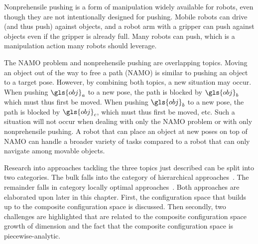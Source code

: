 Nonprehensile pushing is a form of manipulation widely available for robots, even though they are not intentionally designed for pushing. Mobile robots can drive (and thus push) against objects, and a robot arm with a gripper can push against objects even if the gripper is already full. Many robots can push, which is a manipulation action many robots should leverage.\bs

The \ac{NAMO} problem and nonprehensile pushing are overlapping topics. Moving an object out of the way to free a path (\ac{NAMO}) is similar to pushing an object to a target pose. However, by combining both topics, a new situation may occur. When pushing $\gls{obj}_a$ to a new pose, the path is blocked by $\gls{obj}_b$ which must thus first be moved. When pushing $\gls{obj}_b$ to a new pose, the path is blocked by $\gls{obj}_c$, which must thus first be moved, etc. Such a situation will not occur when dealing with only the \ac{NAMO} problem or with only nonprehensile pushing. A robot that can place an object at new poses on top of \ac{NAMO} can handle a broader variety of tasks compared to a robot that can only navigate among movable objects.\bs

Research into approaches tackling the three topics just described can be split into two categories. The bulk falls into the category of hierarchical approaches~\cite{ellis_navigation_2022,krontiris_dealing_2015,scholz_navigation_2016,vega-brown_asymptotically_2020,wang_affordancebased_2020}. The remainder falls in category locally optimal approaches~\cite{novin_dynamic_2018,sabbaghnovin_optimal_2016,sabbaghnovin_model_2021}. Both approaches are elaborated upon later in this chapter. First, the configuration space that builds up to the composite configuration space is discussed. Then secondly, two challenges are highlighted that are related to the composite configuration space growth of dimension and the fact that the composite configuration space is piecewise-analytic.\bs

